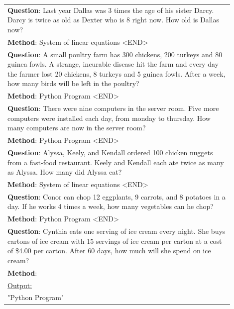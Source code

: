 \documentclass[10pt]{article} %
\begin{document}
\begin{table}[t]
\begin{center}
\begin{tabular}{|p{0.9\linewidth}|}
  \textbf{Question}: Last year Dallas was 3 times the age of his sister Darcy. Darcy is twice as old as Dexter who is 8 right now. How old is Dallas now? \\
  \textbf{Method}: System of linear equations <END> \\
  \textbf{Question}: A small poultry farm has 300 chickens, 200 turkeys and 80 guinea fowls. A strange, incurable disease hit the farm and every day the farmer lost 20 chickens, 8 turkeys and 5 guinea fowls. After a week, how many birds will be left in the poultry? \\
  \textbf{Method}: Python Program <END> \\
  \textbf{Question}: There were nine computers in the server room. Five more computers were installed each day, from monday to thursday. How many computers are now in the server room? \\
  \textbf{Method}: Python Program <END> \\
  \textbf{Question}: Alyssa, Keely, and Kendall ordered 100 chicken nuggets from a fast-food restaurant. Keely and Kendall each ate twice as many as Alyssa. How many did Alyssa eat? \\
  \textbf{Method}: System of linear equations <END> \\
  \textbf{Question}: Conor can chop 12 eggplants, 9 carrots, and 8 potatoes in a day. If he works 4 times a week, how many vegetables can he chop? \\
  \textbf{Method}: Python Program <END> \\
  \hline
  \textbf{Question}: Cynthia eats one serving of ice cream every night.  She buys cartons of ice cream with 15 servings of ice cream per carton at a cost of \$4.00 per carton.  After 60 days, how much will she spend on ice cream? \\
  \textbf{Method}:
  \\
  \hline
  \underline{Output:}\\
  "Python Program" \\
  \hline
  \end{tabular}
  \end{center}
  \end{table}
\end{document}
